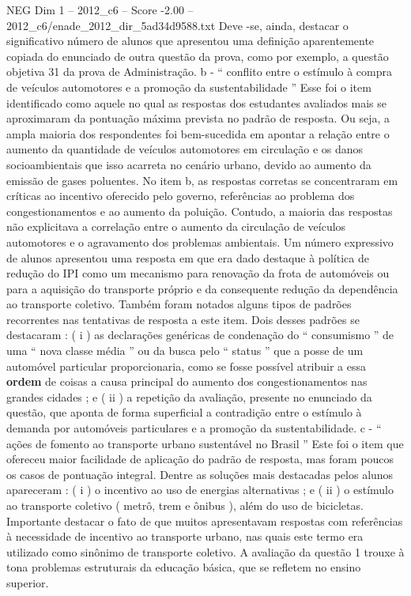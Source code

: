 \begin{textsample}{NEG Dim 1 – 2012\_c6 – Score -2.00 – 2012\_c6/enade\_2012\_dir\_5ad34d9588.txt}
Deve -se, ainda, destacar o significativo número de alunos que apresentou uma definição aparentemente copiada do enunciado de outra questão da prova, como por exemplo, a questão objetiva 31 da prova de Administração. b - “ conflito entre o estímulo à compra de veículos automotores e a promoção da sustentabilidade ” Esse foi o item identificado como aquele no qual as respostas dos estudantes avaliados mais se aproximaram da pontuação máxima prevista no padrão de resposta.
Ou seja, a ampla maioria dos respondentes foi bem-sucedida em apontar a relação entre o aumento da quantidade de veículos automotores em circulação e os danos socioambientais que isso acarreta no cenário urbano, devido ao aumento da emissão de gases poluentes.
No item b, as respostas corretas se concentraram em críticas ao incentivo oferecido pelo governo, referências ao problema dos congestionamentos e ao aumento da poluição.
Contudo, a maioria das respostas não explicitava a correlação entre o aumento da circulação de veículos automotores e o agravamento dos problemas ambientais.
Um número expressivo de alunos apresentou uma resposta em que era dado destaque à política de redução do IPI como um mecanismo para renovação da frota de automóveis ou para a aquisição do transporte próprio e da consequente redução da dependência ao transporte coletivo.
Também foram notados alguns tipos de padrões recorrentes nas tentativas de resposta a este item.
Dois desses padrões se destacaram : ( i ) as declarações genéricas de condenação do “ consumismo ” de uma “ nova classe média ” ou da busca pelo “ status ” que a posse de um automóvel particular proporcionaria, como se fosse possível atribuir a essa \textbf{ordem} de coisas a causa principal do aumento dos congestionamentos nas grandes cidades ; e ( ii ) a repetição da avaliação, presente no enunciado da questão, que aponta de forma superficial a contradição entre o estímulo à demanda por automóveis particulares e a promoção da sustentabilidade. c - “ ações de fomento ao transporte urbano sustentável no Brasil ” Este foi o item que ofereceu maior facilidade de aplicação do padrão de resposta, mas foram poucos os casos de pontuação integral.
Dentre as soluções mais destacadas pelos alunos apareceram : ( i ) o incentivo ao uso de energias alternativas ; e ( ii ) o estímulo ao transporte coletivo ( metrô, trem e ônibus ), além do uso de bicicletas.
Importante destacar o fato de que muitos apresentavam respostas com referências à necessidade de incentivo ao transporte urbano, nas quais este termo era utilizado como sinônimo de transporte coletivo.
A avaliação da questão 1 trouxe à tona problemas estruturais da educação básica, que se refletem no ensino superior.

\end{textsample}
